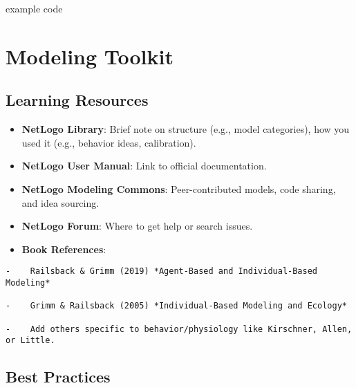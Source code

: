 \documentclass[
]{book}
\providecommand{\tightlist}{%
  \setlength{\itemsep}{0pt}\setlength{\parskip}{0pt}}
\begin{document}
example code

\chapter{Modeling Toolkit}\label{modeling-toolkit}

\section{Learning Resources}\label{learning-resources}

\begin{itemize}
\tightlist
\item
  \textbf{NetLogo Library}: Brief note on structure (e.g., model categories), how you used it (e.g., behavior ideas, calibration).
\end{itemize}

\begin{itemize}
\tightlist
\item
  \textbf{NetLogo User Manual}: Link to official documentation.
\end{itemize}

\begin{itemize}
\tightlist
\item
  \textbf{NetLogo Modeling Commons}: Peer-contributed models, code sharing, and idea sourcing.
\end{itemize}

\begin{itemize}
\tightlist
\item
  \textbf{NetLogo Forum}: Where to get help or search issues.
\end{itemize}

\begin{itemize}
\tightlist
\item
  \textbf{Book References}:
\end{itemize}

\begin{verbatim}
-    Railsback & Grimm (2019) *Agent-Based and Individual-Based Modeling*

-    Grimm & Railsback (2005) *Individual-Based Modeling and Ecology*

-    Add others specific to behavior/physiology like Kirschner, Allen, or Little.
\end{verbatim}

\section{Best Practices}\label{best-practices}
\end{document}
